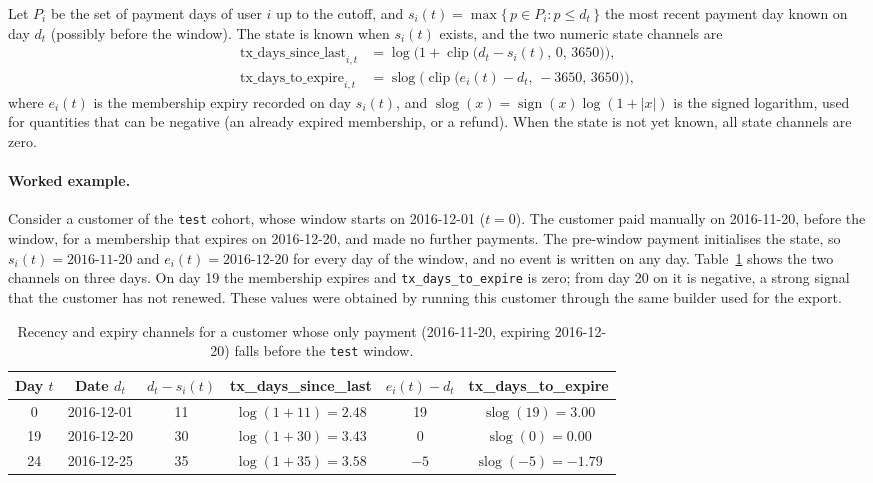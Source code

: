 \documentclass{article}
\newcommand{\slog}{\operatorname{slog}}
\newcommand{\clip}{\operatorname{clip}}
\begin{document}
Let $P_i$ be the set of payment days of user $i$ up to the cutoff, and $s_i(t) = \max \{\, p \in P_i : p \le d_t \,\}$ the most recent payment day known on day $d_t$ (possibly before the window). The state is known when $s_i(t)$ exists, and the two numeric state channels are
\begin{align}
\text{tx\_days\_since\_last}_{i,t} &= \log\!\Big(1 + \clip\big(d_t - s_i(t),\, 0,\, 3650\big)\Big), \\
\text{tx\_days\_to\_expire}_{i,t}  &= \slog\!\Big(\clip\big(e_i(t) - d_t,\, -3650,\, 3650\big)\Big),
\end{align}
where $e_i(t)$ is the membership expiry recorded on day $s_i(t)$, and $\slog(x) = \operatorname{sign}(x)\log(1 + |x|)$ is the signed logarithm, used for quantities that can be negative (an already expired membership, or a refund). When the state is not yet known, all state channels are zero.

\paragraph{Worked example.} Consider a customer of the \texttt{test} cohort, whose window starts on 2016-12-01 ($t = 0$). The customer paid manually on 2016-11-20, before the window, for a membership that expires on 2016-12-20, and made no further payments. The pre-window payment initialises the state, so $s_i(t) = \text{2016-11-20}$ and $e_i(t) = \text{2016-12-20}$ for every day of the window, and no event is written on any day. Table~\ref{tab:w2_example} shows the two channels on three days. On day 19 the membership expires and \texttt{tx\_days\_to\_expire} is zero; from day 20 on it is negative, a strong signal that the customer has not renewed. These values were obtained by running this customer through the same builder used for the export.

\begin{table}[H]
\centering
\renewcommand{\arraystretch}{1.3}
\begin{tabular}{|c|c|c|c|c|c|}
\hline
\textbf{Day $t$} & \textbf{Date $d_t$} & $d_t - s_i(t)$ & \textbf{tx\_days\_since\_last} & $e_i(t) - d_t$ & \textbf{tx\_days\_to\_expire} \\ \hline
0  & 2016-12-01 & 11 & $\log(1 + 11) = 2.48$ & 19  & $\slog(19) = 3.00$ \\ \hline
19 & 2016-12-20 & 30 & $\log(1 + 30) = 3.43$ & 0   & $\slog(0) = 0.00$ \\ \hline
24 & 2016-12-25 & 35 & $\log(1 + 35) = 3.58$ & $-5$ & $\slog(-5) = -1.79$ \\ \hline
\end{tabular}
\caption{Recency and expiry channels for a customer whose only payment (2016-11-20, expiring 2016-12-20) falls before the \texttt{test} window.}
\label{tab:w2_example}
\end{table}
\end{document}
